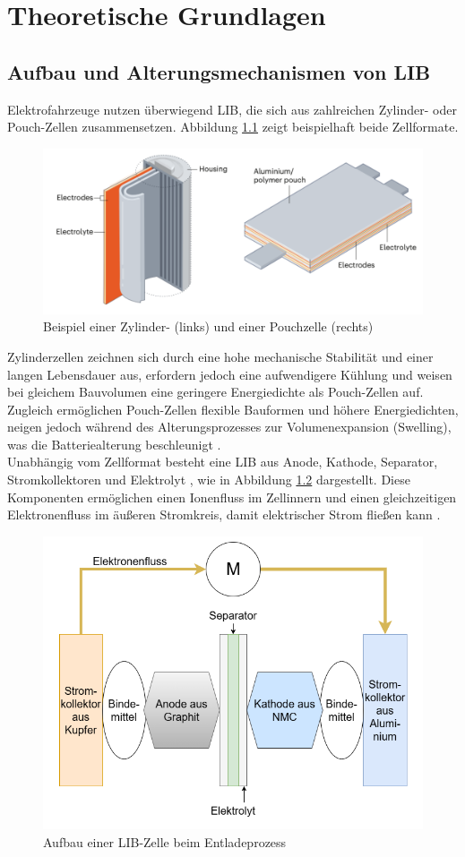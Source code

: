 
\chapter{Theoretische Grundlagen}

\section{Aufbau und Alterungsmechanismen von \acs{LIB}}
Elektrofahrzeuge nutzen überwiegend \acs{LIB}, die sich aus zahlreichen Zylinder- oder Pouch-Zellen zusammensetzen. Abbildung \ref{fig:pouch-zylinder-zelle} zeigt beispielhaft beide Zellformate. 
\begin{figure}[H]
	\centering
	\includegraphics[height=0.25\linewidth]{resources/images/pouch-zylinder-zelle}
	\caption{Beispiel einer Zylinder- (links) und einer Pouchzelle (rechts)}
	\label{fig:pouch-zylinder-zelle}
\end{figure}

Zylinderzellen zeichnen sich durch eine hohe mechanische Stabilität und einer langen Lebensdauer aus, erfordern jedoch eine aufwendigere Kühlung und weisen bei gleichem Bauvolumen eine geringere Energiedichte als Pouch-Zellen auf. Zugleich ermöglichen Pouch-Zellen flexible Bauformen und höhere Energiedichten, neigen jedoch während des Alterungsprozesses zur Volumenexpansion (Swelling), was die Batteriealterung beschleunigt \cite{articlePouchZellenAlterung}.
\\
Unabhängig vom Zellformat besteht eine \acs{LIB} aus Anode, Kathode, Separator, Stromkollektoren und Elektrolyt \cite{urlIdRecentAdvancementsLIB}, wie in Abbildung \ref{fig:aufbau-nmc-zelle} dargestellt. Diese Komponenten ermöglichen einen Ionenfluss im Zellinnern und einen gleichzeitigen Elektronenfluss im äußeren Stromkreis, damit elektrischer Strom fließen kann \cite{urlIdLIBFUnktionsweise}.
\begin{figure}[H]
	\centering
	\includegraphics[height=0.4\linewidth]{resources/images/aufbau-nmc-zelle}
	\caption{Aufbau einer \acs{LIB}-Zelle beim Entladeprozess \cite{articleAlterungLithiumBatterien}}
	\label{fig:aufbau-nmc-zelle}
\end{figure}

